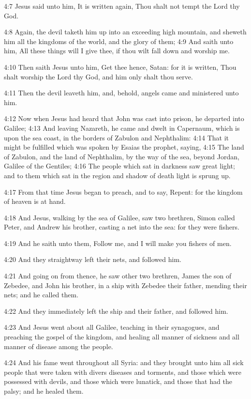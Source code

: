 4:7 Jesus said unto him, It is written again, Thou shalt not tempt the Lord thy God.

4:8 Again, the devil taketh him up into an exceeding high mountain, and sheweth him all the kingdoms of the world, and the glory of them; 4:9 And saith unto him, All these things will I give thee, if thou wilt fall down and worship me.

4:10 Then saith Jesus unto him, Get thee hence, Satan: for it is written, Thou shalt worship the Lord thy God, and him only shalt thou serve.

4:11 Then the devil leaveth him, and, behold, angels came and ministered unto him.

4:12 Now when Jesus had heard that John was cast into prison, he departed into Galilee; 4:13 And leaving Nazareth, he came and dwelt in Capernaum, which is upon the sea coast, in the borders of Zabulon and Nephthalim: 4:14 That it might be fulfilled which was spoken by Esaias the prophet, saying, 4:15 The land of Zabulon, and the land of Nephthalim, by the way of the sea, beyond Jordan, Galilee of the Gentiles; 4:16 The people which sat in darkness saw great light; and to them which sat in the region and shadow of death light is sprung up.

4:17 From that time Jesus began to preach, and to say, Repent: for the kingdom of heaven is at hand.

4:18 And Jesus, walking by the sea of Galilee, saw two brethren, Simon called Peter, and Andrew his brother, casting a net into the sea: for they were fishers.

4:19 And he saith unto them, Follow me, and I will make you fishers of men.

4:20 And they straightway left their nets, and followed him.

4:21 And going on from thence, he saw other two brethren, James the son of Zebedee, and John his brother, in a ship with Zebedee their father, mending their nets; and he called them.

4:22 And they immediately left the ship and their father, and followed him.

4:23 And Jesus went about all Galilee, teaching in their synagogues, and preaching the gospel of the kingdom, and healing all manner of sickness and all manner of disease among the people.

4:24 And his fame went throughout all Syria: and they brought unto him all sick people that were taken with divers diseases and torments, and those which were possessed with devils, and those which were lunatick, and those that had the palsy; and he healed them.

